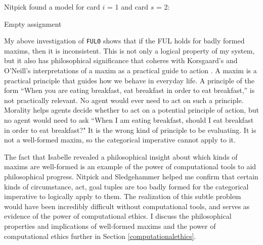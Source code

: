 \begin{isabellebody}
{\color{blue} Nitpick found a model for card $i$ = 1 and card $s$ = 2:

  Empty assignment \color{black}%
}%
\endisatagproof
{\isafoldproof}%
%
\isadelimproof
%
\endisadelimproof
%
\begin{isamarkuptext}%
My above investigation of \texttt{FUL0} shows that if the FUL holds for badly formed maxims, then 
it is inconsistent. This is not only a logical property of my system, but it also has philosophical
significance that coheres with Korsgaard's and O'Neill's interpretations of a maxim as a practical
guide to action \citep{actingforareason,actingonprinciple}. A maxim is a practical principle that guides how we behave in everyday life. A 
principle of the form ``When you are eating breakfast, eat breakfast in order to eat breakfast,'' is not 
practically relevant. No agent would ever need to act on such a principle. Morality helps agents decide
whether to act on a potential principle of action, but no agent would need to ask
``When I am eating breakfast, should I eat breakfast in order to eat breakfast?" It is the wrong kind of 
principle to be evaluating. It is not a well-formed maxim, so the categorical imperative cannot apply to it. 

The fact that Isabelle revealed a philosophical insight about which kinds of maxims are well-formed
is an example of the power of computational tools to aid
philosophical progress. Nitpick and Sledgehammer helped me confirm that certain kinds
of circumstance, act, goal tuples are too badly formed for the categorical imperative to logically 
apply to them. The realization of this subtle problem would have been incredibly difficult without 
computational tools, and serves as evidence of the power of computational ethics. I discuss the philosophical
properties and implications of well-formed maxims and the power of computational ethics further in 
Section \ref{computationalethics}.


\end{isamarkuptext}
\end{isabellebody}
